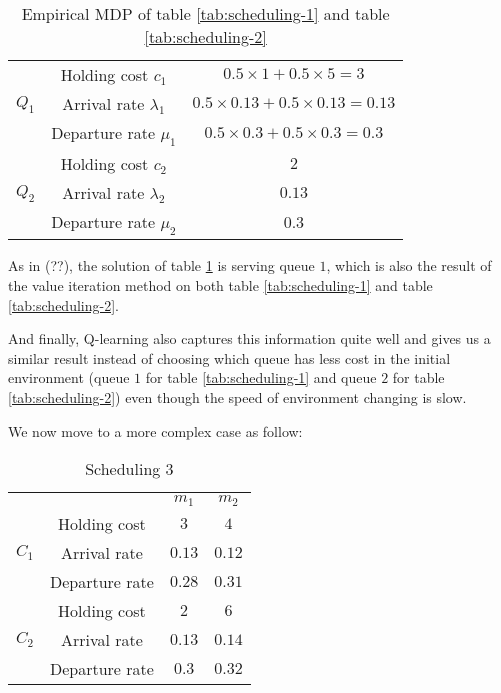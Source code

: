 \documentclass[
  a4paper, xcolor = usenames,dvipsnames]{article}
\theoremstyle{definition}
\theoremstyle{definition}
\theoremstyle{definition}
\theoremstyle{definition}
\theoremstyle{remark}
\begin{document}
\begin{table}[!htbp]
\caption{Empirical MDP of table \ref{tab:scheduling-1} and table \ref{tab:scheduling-2}}
\begin{center}
\begin{tabular}{c c c}
    \hline
    \multirow{3}{*}{$Q_{1}$} & Holding cost $c_{1}$ & $0.5 \times 1 + 0.5 \times 5 = 3$ \\
    & Arrival rate $\lambda_{1}$ & $0.5 \times 0.13 + 0.5 \times 0.13 = 0.13$ \\
    & Departure rate $\mu_{1}$ & $0.5 \times 0.3 + 0.5 \times 0.3 = 0.3$ \\
    \cline{2-3}
    \multirow{3}{*}{$Q_{2}$} & Holding cost $c_{2}$ & $2$ \\
    & Arrival rate $\lambda_{2}$ & $0.13$ \\
    & Departure rate $\mu_{2}$ & $0.3$ \\    
    \hline
\end{tabular}
\end{center}
\label{tab:mdp-scheduling-1}
\end{table}

As in (??), the solution of table \ref{tab:mdp-scheduling-1} is serving queue \(1\), which is also the result of the value iteration method on both table \ref{tab:scheduling-1} and table \ref{tab:scheduling-2}.

And finally, Q-learning also captures this information quite well and gives us a similar result instead of choosing which queue has less cost in the initial environment (queue \(1\) for table \ref{tab:scheduling-1} and queue \(2\) for table \ref{tab:scheduling-2}) even though the speed of environment changing is slow.

We now move to a more complex case as follow:

\begin{table}[!htbp]
\caption{Scheduling 3}
\begin{center}
\begin{tabular}{c c c c}
    \hline
    \multicolumn{2}{c}{} & $m_{1}$ & $m_{2}$ \\
    \cline{2-4}
    \multirow{3}{*}{$C_{1}$} & Holding cost & $3$ & $4$ \\
    & Arrival rate & $0.13$ & $0.12$ \\
    & Departure rate & $0.28$ & $0.31$ \\
    \cline{2-4}
    \multirow{3}{*}{$C_{2}$} & Holding cost & $2$ & $6$ \\
    & Arrival rate & $0.13$ & $0.14$ \\
    & Departure rate & $0.3$ & $0.32$ \\    
    \hline
\end{tabular}
\label{tab:scheduling-3}
\end{center}
\end{table}
\end{document}

